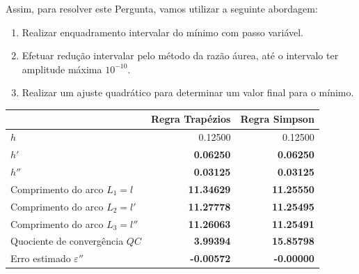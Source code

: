 \documentclass{mnum}
\begin{document}
Assim, para resolver este Pergunta, vamos utilizar a seguinte abordagem:
\begin{enumerate}
    \item Realizar enquadramento intervalar do mínimo com passo variável.
    \item Efetuar redução intervalar pelo método da razão áurea, até o intervalo ter amplitude máxima $10^{-10}$.
    \item Realizar um ajuste quadrático para determinar um valor final para o mínimo.
\end{enumerate}




\begin{center} \begin{tabular}{l | r | r}
    & Regra Trapézios & Regra Simpson \\ \hline
    $h  $ & 0.12500 & 0.12500 \\
    $h' $ & \textbf{0.06250} & \textbf{0.06250} \\
    $h''$ & \textbf{0.03125} & \textbf{0.03125} \\
    Comprimento do arco $L_1=l  $ & \textbf{11.34629} & \textbf{11.25550} \\
    Comprimento do arco $L_2=l' $ & \textbf{11.27778} & \textbf{11.25495} \\
    Comprimento do arco $L_3=l''$ & \textbf{11.26063} & \textbf{11.25491} \\
    Quociente de convergência $QC$ & \textbf{3.99394} & \textbf{15.85798} \\
    Erro estimado $\varepsilon''$ & \textbf{-0.00572} & \textbf{-0.00000}
\end{tabular} \end{center}
\end{document}
